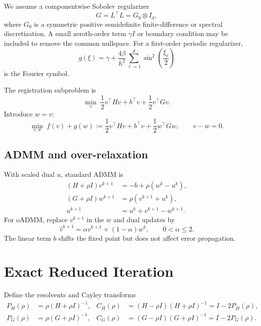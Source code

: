 \documentclass[11pt]{article}
\theoremstyle{definition}
\begin{document}
We assume a componentwise Sobolev regularizer
\begin{equation}
G=L^\top L = G_0\otimes I_d,
\label{eq:G}
\end{equation}
where $G_0$ is a symmetric positive semidefinite finite-difference or spectral discretization. A small zeroth-order term $\gamma I$ or boundary condition may be included to remove the common nullspace. For a first-order periodic regularizer,
\begin{equation}
g(\xi)=\gamma+\frac{4\beta}{h^2}\sum_{\ell=1}^{d}\sin^2\left(\frac{\xi_\ell}{2}\right)
\label{eq:regularizer_symbol}
\end{equation}
 is the Fourier symbol.

The registration subproblem is
\begin{equation}
\min_v\;\frac12 v^\top Hv+b^\top v+\frac12v^\top Gv.
\label{eq:quadratic}
\end{equation}
Introduce $w=v$:
\begin{equation}
\min_{v,w}\;f(v)+g(w)
:=\frac12v^\top Hv+b^\top v+\frac12w^\top Gw,
\qquad v-w=0.
\label{eq:split}
\end{equation}

\subsection{ADMM and over-relaxation}
With scaled dual $u$, standard ADMM is
\begin{align}
(H+\rho I)v^{k+1}&=-b+\rho(w^k-u^k),\label{eq:vupdate}\\
(G+\rho I)w^{k+1}&=\rho(v^{k+1}+u^k),\label{eq:wupdate}\\
u^{k+1}&=u^k+v^{k+1}-w^{k+1}.\label{eq:uupdate}
\end{align}
For oADMM, replace $v^{k+1}$ in the $w$ and dual updates by
\[
\widehat v^{k+1}=\alpha v^{k+1}+(1-\alpha)w^k,
\qquad 0<\alpha\le2.
\]
The linear term $b$ shifts the fixed point but does not affect error propagation.

\section{Exact Reduced Iteration}
Define the resolvents and Cayley transforms
\begin{align}
P_H(\rho)&=\rho(H+\rho I)^{-1},&
C_H(\rho)&=(H-\rho I)(H+\rho I)^{-1}=I-2P_H(\rho),\\
P_G(\rho)&=\rho(G+\rho I)^{-1},&
C_G(\rho)&=(G-\rho I)(G+\rho I)^{-1}=I-2P_G(\rho).
\end{align}
\end{document}
